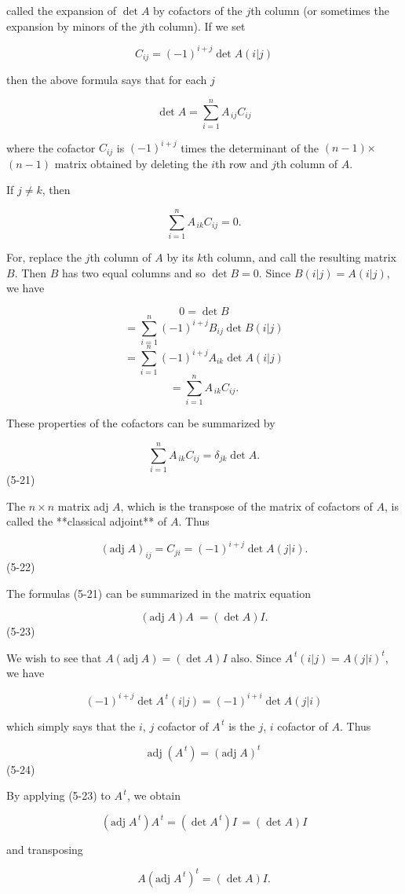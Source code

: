 called the expansion of \(\det A\) by cofactors of the \(j\)th column (or sometimes the expansion by minors of the \(j\)th column). If we set

\[C_{ij}=(-1)^{i+j}\det A(i|j)\]

then the above formula says that for each \(j\)

\[\det A=\sum_{i=1}^{n}A_{\,ij}C_{ij}\]

where the cofactor \(C_{ij}\) is \((-1)^{i+j}\) times the determinant of the \((n-1)\)\(\times\)\((n-1)\) matrix obtained by deleting the \(i\)th row and \(j\)th column of \(A\).

If \(j\neq k\), then

\[\sum_{i=1}^{n}A_{\,ik}C_{ij}=0.\]

For, replace the \(j\)th column of \(A\) by its \(k\)th column, and call the resulting matrix \(B\). Then \(B\) has two equal columns and so \(\det B=0\). Since \(B(i|j)=A(i|j)\), we have

\[0 = \det B\] \[= \sum_{i=1}^{n}(-1)^{i+j}B_{ij}\det B(i|j)\] \[= \sum_{i=1}^{n}(-1)^{i+j}A_{ik}\det A(i|j)\] \[= \sum_{i=1}^{n}A_{\,ik}C_{ij}.\]

These properties of the cofactors can be summarized by

\[\sum_{i=1}^{n}A_{\,ik}C_{ij}=\delta_{jk}\det A.\] (5-21)

The \(n\times n\) matrix adj \(A\), which is the transpose of the matrix of cofactors of \(A\), is called the **classical adjoint** of \(A\). Thus

\[(\mbox{adj}\;A)_{ij}=C_{ji}=(-1)^{i+j}\det A(j|i).\] (5-22)

The formulas (5-21) can be summarized in the matrix equation

\[(\mbox{adj}\;A)A\;=(\det A)I.\] (5-23)

We wish to see that \(A(\mbox{adj}\;A)=(\det A)I\) also. Since \(A^{\,t}(i|j)=A(j|i)^{t}\), we have

\[(-1)^{i+j}\det A^{\,t}(i|j)=(-1)^{i+i}\det A(j|i)\]

which simply says that the \(i\), \(j\) cofactor of \(A^{\,t}\) is the \(j\), \(i\) cofactor of \(A\). Thus

\[\mbox{adj}\;(A^{\,t})=(\mbox{adj}\;A)^{t}\] (5-24)

By applying (5-23) to \(A^{\,t}\), we obtain

\[(\mbox{adj}\;A^{\,t})A^{\,t}=(\det A^{\,t})I\,=(\det A)I\]

and transposing

\[A(\mbox{adj}\;A^{\,t})^{t}=(\det A)I.\] 